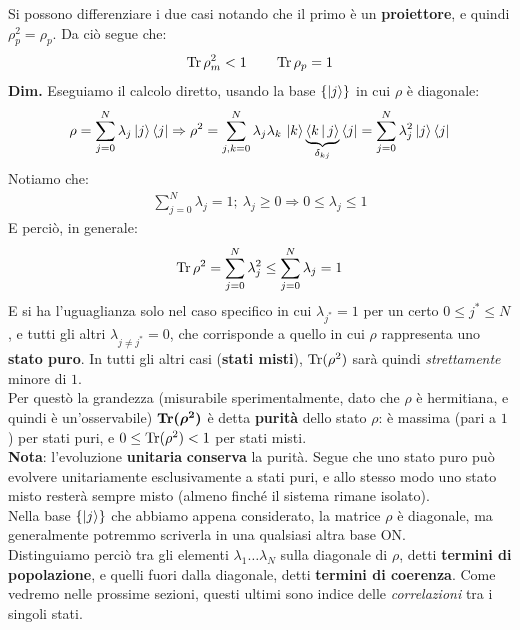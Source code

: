 \documentclass[../../InformazioneQuantistica.tex]{subfiles}
\begin{document}
Si possono differenziare i due casi notando che il primo è un \textbf{proiettore}, e quindi $\rho_p^2 = \rho_p$. Da ciò segue che:
\begin{align*}
\operatorname{Tr} \rho_m^2 < 1 \qquad \operatorname{Tr} \rho_p = 1
\end{align*}
\textbf{Dim.} Eseguiamo il calcolo diretto, usando la base $\{\Ket{j}\}$ in cui $\rho$ è diagonale:
\begin{align*}
\rho = \sum_{j=0}^{N} \lambda_j \Ket{j}\Bra{j} \Rightarrow \rho^2 = \sum_{j,k=0}^N \lambda_j \lambda_k \, \Ket{k}\underbrace{\Braket{k|j}}_{\delta_{kj}}\Bra{j}= \sum_{j=0}^{N} \lambda_j^2 \Ket{j}\Bra{j}
\end{align*}
Notiamo che:
\begin{align*}
\sum_{j=0}^N \lambda_j = 1; \> \lambda_j \geq 0 \Rightarrow 0\leq \lambda_j \leq 1
\end{align*}
E perciò, in generale:
\begin{align*}
\operatorname{Tr} \rho^2 = \sum_{j=0}^N \lambda_j^2  \leq \sum_{j=0}^N \lambda_j = 1
\end{align*}
E si ha l'uguaglianza solo nel caso specifico in cui $\lambda_{j^*}=1$ per un certo $0 \leq j^* \leq N$, e tutti gli altri $\lambda_{j \neq j^*}=0$, che corrisponde a quello in cui $\rho$ rappresenta uno \textbf{stato puro}. In tutti gli altri casi (\textbf{stati misti}), $\operatorname{Tr}(\rho^2)$ sarà quindi \textit{strettamente} minore di $1$.\\
Per questò la grandezza (misurabile sperimentalmente, dato che $\rho$ è hermitiana, e quindi è un'osservabile) $\operatorname{\textbf{Tr}}\bm{(\rho^2)}$ è detta \textbf{purità} dello stato $\rho$: è massima (pari a $1$) per stati puri, e $0\leq \operatorname{Tr}(\rho^2) < 1$ per stati misti.\\

\textbf{Nota}: l'evoluzione \textbf{unitaria} \textbf{conserva} la purità. Segue che uno stato puro può evolvere unitariamente esclusivamente a stati puri, e allo stesso modo uno stato misto resterà sempre misto (almeno finché il sistema rimane isolato).\\

Nella base $\{\Ket{j}\}$ che abbiamo appena considerato, la matrice $\rho$ è diagonale, ma generalmente potremmo scriverla in una qualsiasi altra base ON.\\
Distinguiamo perciò tra gli elementi $\lambda_1 \dots \lambda_N$ sulla diagonale di $\rho$, detti \textbf{termini di popolazione}, e quelli fuori dalla diagonale, detti \textbf{termini di coerenza}. Come vedremo nelle prossime sezioni, questi ultimi sono indice delle \textit{correlazioni} tra i singoli stati.\\
\end{document}
